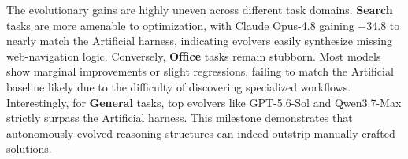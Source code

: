 

The evolutionary gains are highly uneven across different task domains. \textbf{Search} tasks are more amenable to optimization, with Claude Opus-4.8 gaining +34.8 to nearly match the Artificial harness, indicating evolvers easily synthesize missing web-navigation logic. Conversely, \textbf{Office} tasks remain stubborn. Most models show marginal improvements or slight regressions, failing to match the Artificial baseline likely due to the difficulty of discovering specialized workflows. Interestingly, for \textbf{General} tasks, top evolvers like GPT-5.6-Sol and Qwen3.7-Max strictly surpass the Artificial harness. This milestone demonstrates that autonomously evolved reasoning structures can indeed outstrip manually crafted solutions.

